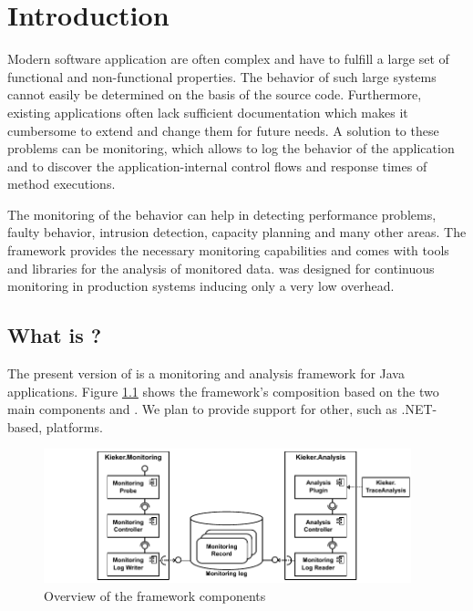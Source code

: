 % 


\chapter{Introduction}\label{chap:introduction}

Modern software application are often complex and have to fulfill a large set of functional and non-functional properties. The behavior of such large systems cannot easily be determined on the basis of the source code. Furthermore, existing applications often lack sufficient documentation which makes it cumbersome to extend and change them for future needs. A solution to these problems can be monitoring, which allows to log the behavior of the application and to discover the application-internal control flows and response times of method executions.

The monitoring of the behavior can help in detecting performance problems, faulty behavior, intrusion detection, capacity planning and many other areas. The \Kieker{} framework provides the necessary monitoring capabilities and comes with tools and libraries for the analysis of monitored data. \Kieker{} was designed for %
continuous monitoring in production systems inducing only a very low overhead. 

\section{What is \Kieker?}\label{sec:kieker}

The present version of \Kieker{} is a monitoring and analysis framework for Java applications. Figure \ref{fig:KiekerComponentDiagram} shows the framework's composition based on the two main components \KiekerMonitoringPart{} and \KiekerAnalysisPart{}. %
We plan to provide support for other, such as .NET-based, platforms.

\begin{figure}[H]\centering
\includegraphics[width=0.95\textwidth]{images/kiekerComponentDiagram-woCloud-bw-w-record-newNames-withTraceAnalysis}
\caption{Overview of the framework components}
\label{fig:KiekerComponentDiagram}
\end{figure}
		
